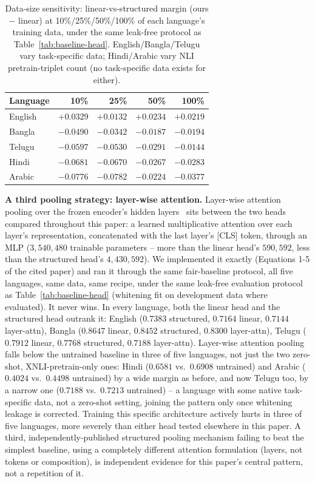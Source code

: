 \documentclass[manuscript]{acmart}
\begin{document}
\begin{table}[h]
\caption{Data-size sensitivity: linear-vs-structured margin (ours $-$ linear) at 10\%/25\%/50\%/100\% of each language's training data, under the same leak-free protocol as Table~\ref{tab:baseline-head}. English/Bangla/Telugu vary task-specific data; Hindi/Arabic vary NLI pretrain-triplet count (no task-specific data exists for either).}
\label{tab:data-size}
\begin{tabular}{@{}lrrrr@{}}
\toprule
Language & 10\% & 25\% & 50\% & 100\% \\
\midrule
English & $+0.0329$ & $+0.0132$ & $+0.0234$ & $+0.0219$ \\
Bangla  & $-0.0490$ & $-0.0342$ & $-0.0187$ & $-0.0194$ \\
Telugu  & $-0.0597$ & $-0.0530$ & $-0.0291$ & $-0.0144$ \\
Hindi   & $-0.0681$ & $-0.0670$ & $-0.0267$ & $-0.0283$ \\
Arabic  & $-0.0776$ & $-0.0782$ & $-0.0224$ & $-0.0377$ \\
\bottomrule
\end{tabular}
\end{table}

\textbf{A third pooling strategy: layer-wise attention.} Layer-wise attention pooling over the frozen encoder's hidden layers~\citep{oh2022dontjudge} sits between the two heads compared throughout this paper: a learned multiplicative attention over each layer's representation, concatenated with the last layer's [CLS] token, through an MLP ($3{,}540{,}480$ trainable parameters -- more than the linear head's $590{,}592$, less than the structured head's $4{,}430{,}592$). We implemented it exactly (Equations 1-5 of the cited paper) and ran it through the same fair-baseline protocol, all five languages, same data, same recipe, under the same leak-free evaluation protocol as Table~\ref{tab:baseline-head} (whitening fit on development data where evaluated). It never wins. In every language, both the linear head and the structured head outrank it: English ($0.7383$ structured, $0.7164$ linear, $0.7144$ layer-attn), Bangla ($0.8647$ linear, $0.8452$ structured, $0.8300$ layer-attn), Telugu ($0.7912$ linear, $0.7768$ structured, $0.7188$ layer-attn). Layer-wise attention pooling falls below the untrained baseline in three of five languages, not just the two zero-shot, XNLI-pretrain-only ones: Hindi ($0.6581$ vs.\ $0.6908$ untrained) and Arabic ($0.4024$ vs.\ $0.4498$ untrained) by a wide margin as before, and now Telugu too, by a narrow one ($0.7188$ vs.\ $0.7213$ untrained) -- a language with some native task-specific data, not a zero-shot setting, joining the pattern only once whitening leakage is corrected. Training this specific architecture actively hurts in three of five languages, more severely than either head tested elsewhere in this paper. A third, independently-published structured pooling mechanism failing to beat the simplest baseline, using a completely different attention formulation (layers, not tokens or composition), is independent evidence for this paper's central pattern, not a repetition of it.
\end{document}
